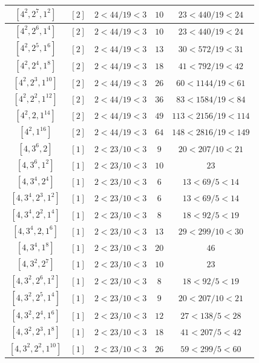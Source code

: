 \documentclass{article}%
\begin{document}
\begin{center}
\begin{longtable}{||c|c|c|c|c||}
$[4^{2}, 2^{7}, 1^{2}]$ & $[2]$ & $2 < 44/19 < 3$ & $10$ & $23 < 440/19 < 24$ \\ \hline 
$[4^{2}, 2^{6}, 1^{4}]$ & $[2]$ & $2 < 44/19 < 3$ & $10$ & $23 < 440/19 < 24$ \\ \hline 
$[4^{2}, 2^{5}, 1^{6}]$ & $[2]$ & $2 < 44/19 < 3$ & $13$ & $30 < 572/19 < 31$ \\ \hline 
$[4^{2}, 2^{4}, 1^{8}]$ & $[2]$ & $2 < 44/19 < 3$ & $18$ & $41 < 792/19 < 42$ \\ \hline 
$[4^{2}, 2^{3}, 1^{10}]$ & $[2]$ & $2 < 44/19 < 3$ & $26$ & $60 < 1144/19 < 61$ \\ \hline 
$[4^{2}, 2^{2}, 1^{12}]$ & $[2]$ & $2 < 44/19 < 3$ & $36$ & $83 < 1584/19 < 84$ \\ \hline 
$[4^{2}, 2, 1^{14}]$ & $[2]$ & $2 < 44/19 < 3$ & $49$ & $113 < 2156/19 < 114$ \\ \hline 
$[4^{2}, 1^{16}]$ & $[2]$ & $2 < 44/19 < 3$ & $64$ & $148 < 2816/19 < 149$ \\ \hline 
$[4, 3^{6}, 2]$ & $[1]$ & $2 < 23/10 < 3$ & $9$ & $20 < 207/10 < 21$ \\ \hline 
$[4, 3^{6}, 1^{2}]$ & $[1]$ & $2 < 23/10 < 3$ & $10$ & $23$ \\ \hline 
$[4, 3^{4}, 2^{4}]$ & $[1]$ & $2 < 23/10 < 3$ & $6$ & $13 < 69/5 < 14$ \\ \hline 
$[4, 3^{4}, 2^{3}, 1^{2}]$ & $[1]$ & $2 < 23/10 < 3$ & $6$ & $13 < 69/5 < 14$ \\ \hline 
$[4, 3^{4}, 2^{2}, 1^{4}]$ & $[1]$ & $2 < 23/10 < 3$ & $8$ & $18 < 92/5 < 19$ \\ \hline 
$[4, 3^{4}, 2, 1^{6}]$ & $[1]$ & $2 < 23/10 < 3$ & $13$ & $29 < 299/10 < 30$ \\ \hline 
$[4, 3^{4}, 1^{8}]$ & $[1]$ & $2 < 23/10 < 3$ & $20$ & $46$ \\ \hline 
$[4, 3^{2}, 2^{7}]$ & $[1]$ & $2 < 23/10 < 3$ & $10$ & $23$ \\ \hline 
$[4, 3^{2}, 2^{6}, 1^{2}]$ & $[1]$ & $2 < 23/10 < 3$ & $8$ & $18 < 92/5 < 19$ \\ \hline 
$[4, 3^{2}, 2^{5}, 1^{4}]$ & $[1]$ & $2 < 23/10 < 3$ & $9$ & $20 < 207/10 < 21$ \\ \hline 
$[4, 3^{2}, 2^{4}, 1^{6}]$ & $[1]$ & $2 < 23/10 < 3$ & $12$ & $27 < 138/5 < 28$ \\ \hline 
$[4, 3^{2}, 2^{3}, 1^{8}]$ & $[1]$ & $2 < 23/10 < 3$ & $18$ & $41 < 207/5 < 42$ \\ \hline 
$[4, 3^{2}, 2^{2}, 1^{10}]$ & $[1]$ & $2 < 23/10 < 3$ & $26$ & $59 < 299/5 < 60$ \\ \hline 

\end{longtable}
\end{center}
\end{document}
